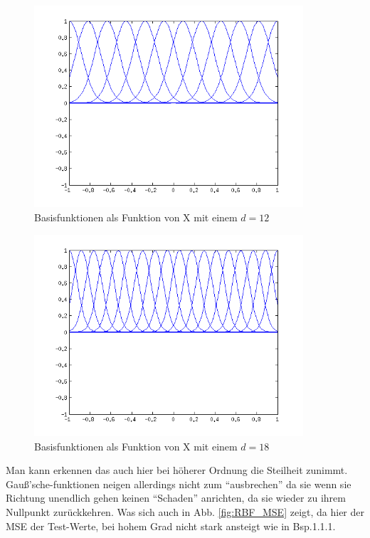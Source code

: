 \begin{figure}[hp!]
\begin{center}
 \includegraphics[width=10cm]{./figures/RBF_12}
 \caption[Basisfunktionen als Funktion von X, d=12]{Basisfunktionen als Funktion von X mit einem $d=12$}
\label{fig:RBF_12}
\end{center}
\end{figure}


\begin{figure}[hp!]
\begin{center}
 \includegraphics[width=10cm]{./figures/RBF_18}
 \caption[Basisfunktionen als Funktion von X, d=18]{Basisfunktionen als Funktion von X mit einem $d=18$}
\label{fig:RBF_18}
\end{center}
\end{figure}
Man kann erkennen das auch hier bei höherer Ordnung die Steilheit zunimmt. Gau\ss{}'sche-funktionen neigen allerdings nicht zum ``ausbrechen''
da sie wenn sie Richtung unendlich gehen keinen ``Schaden'' anrichten, da sie wieder zu ihrem Nullpunkt zurückkehren.
Was sich auch in Abb. \ref{fig:RBF_MSE} zeigt, da hier der MSE der Test-Werte, bei hohem Grad nicht stark ansteigt wie in Bsp.1.1.1.
 

